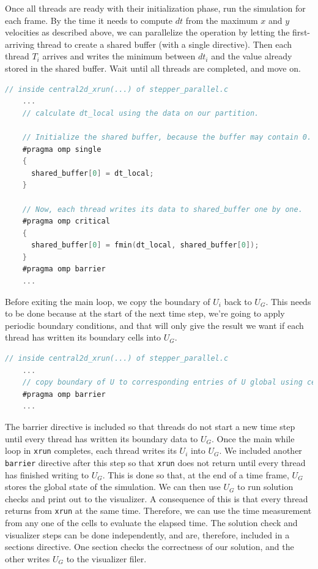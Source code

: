 \documentclass{article}
\begin{document}
Once all threads are ready with their initialization phase, run the simulation for each frame. By the time it needs to compute $dt$ from the maximum $x$ and $y$ velocities as described above, we can parallelize the operation by letting the first-arriving thread to create a shared buffer (with a single directive). Then each thread $T_i$ arrives and writes the minimum between $dt_i$ and the value already stored in the shared buffer. Wait until all threads are completed, and move on.

\begin{lstlisting}[language=C]
// inside central2d_xrun(...) of stepper_parallel.c
    ...
    // calculate dt_local using the data on our partition.

    // Initialize the shared buffer, because the buffer may contain 0.
    #pragma omp single
    {
      shared_buffer[0] = dt_local;
    }

    // Now, each thread writes its data to shared_buffer one by one.
    #pragma omp critical
    {
      shared_buffer[0] = fmin(dt_local, shared_buffer[0]);
    }
    #pragma omp barrier
    ...
\end{lstlisting}

Before exiting the main loop, we copy the boundary of $U_i$ back to $U_G$. This needs to be done because at the start of the next time step, we're going to apply periodic boundary conditions, and that will only give the result we want if each thread has written its boundary cells into $U_G$.

\begin{lstlisting}[language=C]
// inside central2d_xrun(...) of stepper_parallel.c
    ...
    // copy boundary of U to corresponding entries of U global using central2d_local_to_global(...)
    #pragma omp barrier
    ...
\end{lstlisting}

The barrier directive is included so that threads do not start a new time step until every thread has written its boundary data to $U_G$.
Once the main while loop in \texttt{xrun} completes, each thread writes its $U_i$ into $U_G$.
We included another \texttt{barrier} directive after this step so that \texttt{xrun} does not return until every thread has finished writing to $U_G$.
This is done so that, at the end of a time frame, $U_G$ stores the global state of the simulation.
We can then use $U_G$ to run solution checks and print out to the visualizer.
A consequence of this is that every thread returns from \texttt{xrun} at the same time.
Therefore, we can use the time measurement from any one of the cells to evaluate the elapsed time.
The solution check and visualizer steps can be done independently, and are, therefore, included in a sections directive.
One section checks the correctness of our solution, and the other writes $U_G$ to the visualizer filer.
\end{document}
